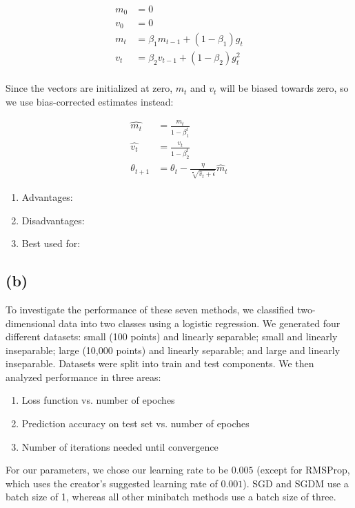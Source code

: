 \documentclass[twoside,11pt]{homework}
\begin{document}
\begin{align*}
	m_0 &= 0\\
	v_0 &= 0\\
	m_t &= \beta_1 m_{t-1}+(1-\beta_1)g_t\\
	v_t &= \beta_2 v_{t-1}+(1-\beta_2)g^2_t\\
\end{align*} 

Since the vectors are initialized at zero, $m_t$ and $v_t$ will be biased towards zero, so we use bias-corrected estimates instead:

\begin{align*}
	\hat{m_t} &= \frac{m_t}{1-\beta^t_1}\\
	\hat{v_t} &= \frac{v_t}{1-\beta^t_2}\\
	\theta_{t+1} &= \theta_t - \frac{\eta}{\sqrt[•]{\hat{v}_t+\epsilon}}\hat{m}_t
\end{align*}

\begin{enumerate}
	\item Advantages:
	\item Disadvantages:
	\item Best used for:
\end{enumerate}

\subsection*{(b)}
To investigate the performance of these seven methods, we classified two-dimensional data into two classes using a logistic regression. We generated four different datasets: small (100 points) and linearly separable; small and linearly inseparable; large (10,000 points) and linearly separable; and large and linearly inseparable. Datasets were split into train and test components. We then analyzed performance in three areas:

\begin{enumerate}
	\item Loss function vs. number of epoches
	\item Prediction accuracy on test set vs. number of epoches
	\item Number of iterations needed until convergence
\end{enumerate}

For our parameters, we chose our learning rate to be $0.005$ (except for RMSProp, which uses the creator's suggested learning rate of $0.001$). SGD and SGDM use a batch size of 1, whereas all other minibatch methods use a batch size of three.
\end{document}
